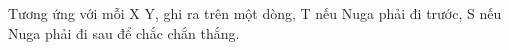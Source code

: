 Tương ứng với mỗi X Y, ghi ra trên một dòng, T nếu Nuga phải đi trước, S nếu Nuga phải đi sau để chắc chắn thắng.